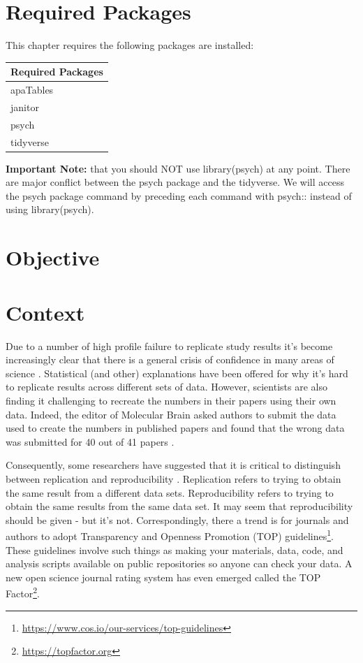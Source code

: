 \documentclass[
]{krantz}
\renewcommand{\href}[2]{#2\footnote{\url{#1}}}
\begin{document}
\hypertarget{required-packages}{%
\section{Required Packages}\label{required-packages}}

This chapter requires the following packages are installed:

\begin{longtable}[]{@{}l@{}}
\toprule
Required Packages\tabularnewline
\midrule
\endhead
apaTables\tabularnewline
janitor\tabularnewline
psych\tabularnewline
tidyverse\tabularnewline
\bottomrule
\end{longtable}

\textbf{Important Note:} that you should NOT use library(psych) at any point. There are major conflict between the psych package and the tidyverse. We will access the psych package command by preceding each command with psych:: instead of using library(psych).

\hypertarget{objective-1}{%
\section{Objective}\label{objective-1}}

\hypertarget{context}{%
\section{Context}\label{context}}

Due to a number of high profile failure to replicate study results \citep{cos2015} it's become increasingly clear that there is a general crisis of confidence in many areas of science \citep{baker2016}. Statistical (and other) explanations have been offered \citep{simmons2011} for why it's hard to replicate results across different sets of data. However, scientists are also finding it challenging to recreate the numbers in their papers using their own data. Indeed, the editor of Molecular Brain asked authors to submit the data used to create the numbers in published papers and found that the wrong data was submitted for 40 out of 41 papers \citep{miyakawa2020}.

Consequently, some researchers have suggested that it is critical to distinguish between replication and reproducibility \citep{patil2019}. Replication refers to trying to obtain the same result from a different data sets. Reproducibility refers to trying to obtain the same results from the same data set. It may seem that reproducibility should be given - but it's not. Correspondingly, there a trend is for journals and authors to adopt Transparency and Openness Promotion (TOP) \href{https://www.cos.io/our-services/top-guidelines}{guidelines}. These guidelines involve such things as making your materials, data, code, and analysis scripts available on public repositories so anyone can check your data. A new open science journal rating system has even emerged called the \href{https://topfactor.org}{TOP Factor}.
\end{document}
